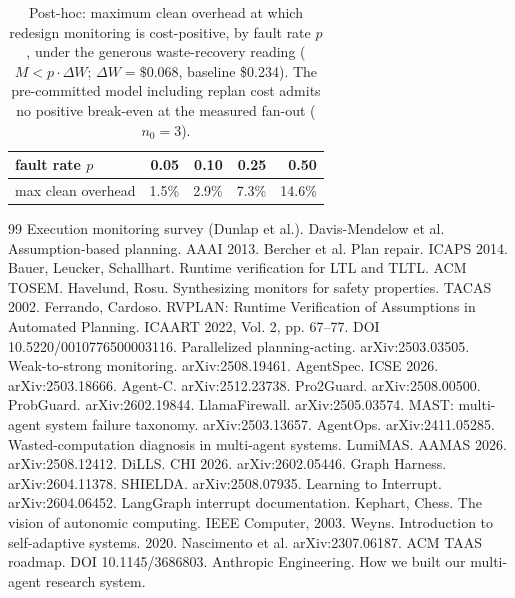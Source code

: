 \documentclass[acmsmall,screen]{acmart}
\begin{document}
\begin{table}[t]
\caption{Post-hoc: maximum clean overhead at which redesign monitoring is
cost-positive, by fault rate $p$, under the generous waste-recovery reading
($M<p\cdot\Delta W$; $\Delta W=\$0.068$, baseline \$0.234). The pre-committed
model including replan cost admits no positive break-even at the measured fan-out
($n_0=3$).}
\label{tab:breakeven-locate}
\begin{tabular}{lrrrr}
\toprule
fault rate $p$     & 0.05 & 0.10 & 0.25 & 0.50 \\
\midrule
max clean overhead & 1.5\% & 2.9\% & 7.3\% & 14.6\% \\
\bottomrule
\end{tabular}
\end{table}

\begin{thebibliography}{99}
 Execution monitoring survey (Dunlap et al.).
 Davis-Mendelow et al. Assumption-based planning. AAAI 2013.
 Bercher et al. Plan repair. ICAPS 2014.
 Bauer, Leucker, Schallhart. Runtime verification for LTL and TLTL. ACM TOSEM.
 Havelund, Rosu. Synthesizing monitors for safety properties. TACAS 2002.
 Ferrando, Cardoso. RVPLAN: Runtime Verification of Assumptions in Automated Planning. ICAART 2022, Vol. 2, pp. 67--77. DOI 10.5220/0010776500003116.
 Parallelized planning-acting. arXiv:2503.03505.
 Weak-to-strong monitoring. arXiv:2508.19461.
 AgentSpec. ICSE 2026. arXiv:2503.18666.
 Agent-C. arXiv:2512.23738.
 Pro2Guard. arXiv:2508.00500.
 ProbGuard. arXiv:2602.19844.
 LlamaFirewall. arXiv:2505.03574.
 MAST: multi-agent system failure taxonomy. arXiv:2503.13657.
 AgentOps. arXiv:2411.05285.
 Wasted-computation diagnosis in multi-agent systems.
 LumiMAS. AAMAS 2026. arXiv:2508.12412.
 DiLLS. CHI 2026. arXiv:2602.05446.
 Graph Harness. arXiv:2604.11378.
 SHIELDA. arXiv:2508.07935.
 Learning to Interrupt. arXiv:2604.06452.
 LangGraph interrupt documentation.
 Kephart, Chess. The vision of autonomic computing. IEEE Computer, 2003.
 Weyns. Introduction to self-adaptive systems. 2020.
 Nascimento et al. arXiv:2307.06187.
 ACM TAAS roadmap. DOI 10.1145/3686803.
 Anthropic Engineering. How we built our multi-agent research system.

\end{thebibliography}
\end{document}
